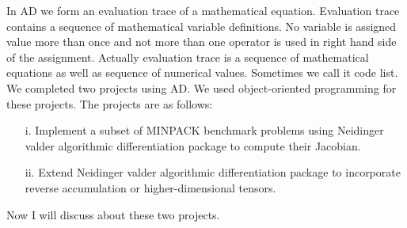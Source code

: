\documentclass[paper=letter, fontsize=12pt]{scrartcl} %
\begin{document}
In AD we form an evaluation trace of a mathematical equation. Evaluation trace contains a sequence of mathematical variable definitions. No variable is assigned value more than once and not more than one operator is used in right hand side of the assignment. Actually evaluation trace is a sequence of mathematical equations as well as sequence of numerical values. Sometimes we call it code list.\\ 
We completed two projects using AD. We used object-oriented programming for these projects. The projects are as follows:
\begin{enumerate} [align=left,style=nextline,leftmargin=1.5cm,labelsep=\parindent,font=\normalfont]
\item[i.] Implement a subset of MINPACK benchmark problems using Neidinger valder algorithmic
differentiation package to compute their Jacobian.
\item[ii.] Extend Neidinger valder algorithmic differentiation package to incorporate reverse accumulation or higher-dimensional tensors.
\end{enumerate}
Now I will discuss about these two projects.\newline
\pagebreak
\end{document}
